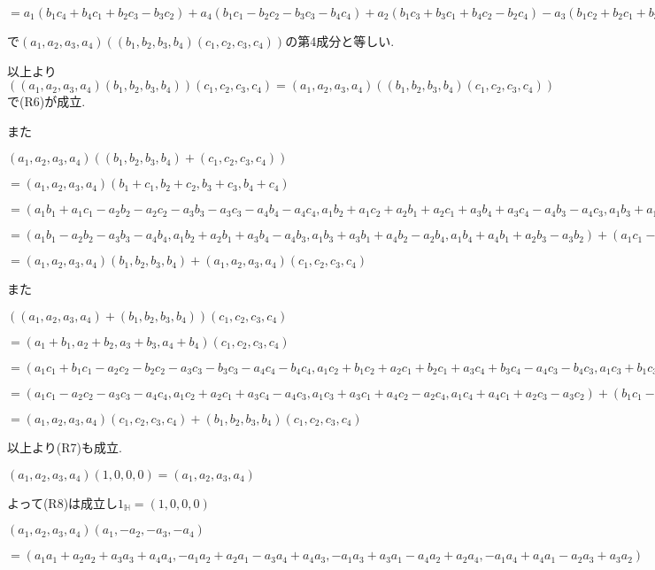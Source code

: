\documentclass{jsarticle}
\begin{document}
$=a_1(b_1c_4+b_4c_1+b_2c_3-b_3c_2)+
a_4(b_1c_1-b_2c_2-b_3c_3-b_4c_4)+
a_2(b_1c_3+b_3c_1+b_4c_2-b_2c_4)-a_3(b_1c_2+b_2c_1+b_3c_4-b_4c_3)$

で$(a_1,a_2,a_3,a_4)((b_1,b_2,b_3,b_4)(c_1,c_2,c_3,c_4))$の第4成分と等しい.

以上より$((a_1,a_2,a_3,a_4)(b_1,b_2,b_3,b_4))(c_1,c_2,c_3,c_4)=(a_1,a_2,a_3,a_4)((b_1,b_2,b_3,b_4)(c_1,c_2,c_3,c_4))$で(R6)が成立.

また

$(a_1,a_2,a_3,a_4)((b_1,b_2,b_3,b_4)+(c_1,c_2,c_3,c_4))
$

$=(a_1,a_2,a_3,a_4)(b_1+c_1,b_2+c_2,b_3+c_3,b_4+c_4)$

$=(a_1b_1+a_1c_1-a_2b_2-a_2c_2-a_3b_3-a_3c_3-a_4b_4-a_4c_4,
a_1b_2+a_1c_2+a_2b_1+a_2c_1+a_3b_4+a_3c_4-a_4b_3-a_4c_3,
a_1b_3+a_1c_3+a_3b_1+a_3c_1+a_4b_2+a_4c_2-a_2b_4-a_2c_4,
a_1b_4+a_1c_4+a_4b_1+a_4c_1+a_2b_3+a_2c_3-a_3b_2-a_3c_2)$

$=(a_1b_1-a_2b_2-a_3b_3-a_4b_4,
a_1b_2+a_2b_1+a_3b_4-a_4b_3,
a_1b_3+a_3b_1+a_4b_2-a_2b_4,
a_1b_4+a_4b_1+a_2b_3-a_3b_2)+
(a_1c_1-a_2c_2-a_3c_3-a_4c_4,
a_1c_2+a_2c_1+a_3c_4-a_4c_3,
a_1c_3+a_3c_1+a_4c_2-a_2c_4,
a_1c_4+a_4c_1+a_2c_3-a_3c_2)$

$=(a_1,a_2,a_3,a_4)(b_1,b_2,b_3,b_4)+(a_1,a_2,a_3,a_4)(c_1,c_2,c_3,c_4)$

また

$((a_1,a_2,a_3,a_4)+(b_1,b_2,b_3,b_4))(c_1,c_2,c_3,c_4)
$

$=(a_1+b_1,a_2+b_2,a_3+b_3,a_4+b_4)(c_1,c_2,c_3,c_4)$

$=(a_1c_1+b_1c_1-a_2c_2-b_2c_2-a_3c_3-b_3c_3-a_4c_4-b_4c_4,
a_1c_2+b_1c_2+a_2c_1+b_2c_1+a_3c_4+b_3c_4-a_4c_3-b_4c_3,
a_1c_3+b_1c_3+a_3c_1+b_3c_1+a_4c_2+b_4c_2-a_2c_4-b_2c_4,
a_1c_4+b_1c_4+a_4c_1+b_4c_1+a_2c_3+b_2c_3-a_3c_2-b_3c_2)$

$=(a_1c_1-a_2c_2-a_3c_3-a_4c_4,
a_1c_2+a_2c_1+a_3c_4-a_4c_3,
a_1c_3+a_3c_1+a_4c_2-a_2c_4,
a_1c_4+a_4c_1+a_2c_3-a_3c_2)+
(b_1c_1-b_2c_2-b_3c_3-b_4c_4,
b_1c_2+b_2c_1+b_3c_4-b_4c_3,
b_1c_3+b_3c_1+b_4c_2-b_2c_4,
b_1c_4+b_4c_1+b_2c_3-b_3c_2)$

$=(a_1,a_2,a_3,a_4)(c_1,c_2,c_3,c_4)+
(b_1,b_2,b_3,b_4)(c_1,c_2,c_3,c_4)$

以上より(R7)も成立.

$(a_1,a_2,a_3,a_4)(1,0,0,0)=(a_1,a_2,a_3,a_4)$

よって(R8)は成立し$1_\mathbb{H}=(1,0,0,0)$

$(a_1,a_2,a_3,a_4)(a_1,-a_2,-a_3,-a_4)$

$=(a_1a_1+a_2a_2+a_3a_3+a_4a_4,
-a_1a_2+a_2a_1-a_3a_4+a_4a_3,
-a_1a_3+a_3a_1-a_4a_2+a_2a_4,
-a_1a_4+a_4a_1-a_2a_3+a_3a_2)$
\end{document}
